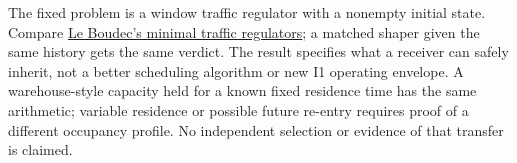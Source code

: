 \documentclass{article}
\begin{document}
The fixed problem is a window traffic regulator with a nonempty initial state. Compare \href{https://arxiv.org/abs/1801.08477}{Le Boudec's minimal traffic regulators}; a matched shaper given the same history gets the same verdict. The result specifies what a receiver can safely inherit, not a better scheduling algorithm or new I1 operating envelope. A warehouse-style capacity held for a known fixed residence time has the same arithmetic; variable residence or possible future re-entry requires proof of a different occupancy profile. No independent selection or evidence of that transfer is claimed.
\end{document}
